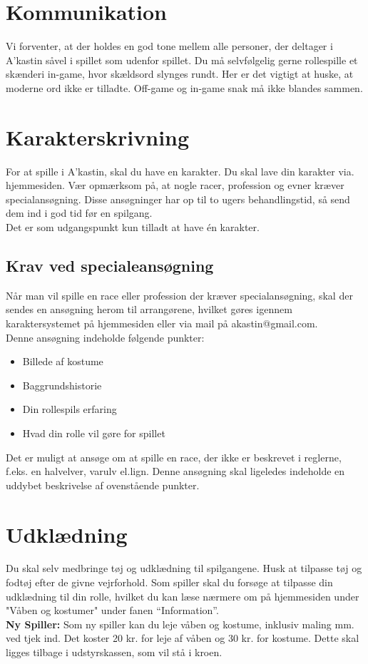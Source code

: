 \section*{Kommunikation}
Vi forventer, at der holdes en god tone mellem alle personer, der deltager i A’kastin såvel i spillet som udenfor spillet. Du må selvfølgelig gerne rollespille et skænderi in-game, hvor skældsord slynges rundt. Her er det vigtigt at huske, at moderne ord ikke er tilladte. Off-game og in-game snak må ikke blandes sammen.
\section*{Karakterskrivning}
For at spille i A’kastin, skal du have en karakter. Du skal lave din karakter
via. hjemmesiden. Vær opmærksom på, at nogle racer, profession og evner kræver specialansøgning. Disse ansøgninger har op til to ugers behandlingstid, så send dem ind i god tid før en spilgang.\\
Det er som udgangspunkt kun tilladt at have én karakter.\\

\subsection*{Krav ved specialeansøgning}
Når man vil spille en race eller profession der kræver specialansøgning, skal der sendes en ansøgning herom til arrangørene, hvilket gøres igennem karaktersystemet på hjemmesiden eller via mail på akastin@gmail.com.\\
Denne ansøgning indeholde følgende punkter:
\begin{itemize}
    \item Billede af kostume
    \item Baggrundshistorie
    \item Din rollespils erfaring
    \item Hvad din rolle vil gøre for spillet
\end{itemize}
Det er muligt at ansøge om at spille en race, der ikke er beskrevet i reglerne, f.eks. en halvelver, varulv el.lign. Denne ansøgning skal ligeledes indeholde en uddybet beskrivelse af ovenstående punkter.\\

\section*{Udklædning}
Du skal selv medbringe tøj og udklædning til spilgangene. Husk at tilpasse tøj og fodtøj efter de givne vejrforhold. Som spiller skal du forsøge at tilpasse din udklædning til din rolle, hvilket du kan læse nærmere om på hjemmesiden under  "Våben og kostumer" under fanen “Information”.\\
\textbf{Ny Spiller:} Som ny spiller kan du leje våben og kostume, inklusiv maling mm. ved tjek ind. Det koster 20 kr. for leje af våben og 30 kr. for kostume. Dette skal ligges tilbage i udstyrskassen, som vil stå i kroen.

